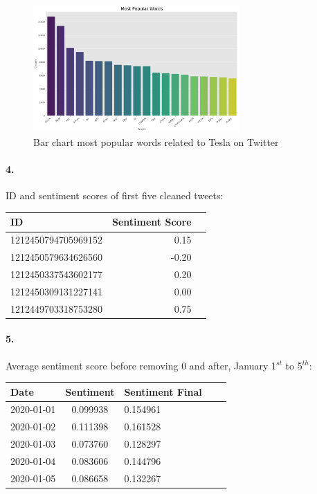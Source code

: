 \documentclass[12pt]{article}
\begin{document}
\begin{figure}[h!]
    \centering
    \includegraphics[width=0.7\textwidth]{images/popular_words.pdf}
    \caption{Bar chart most popular words related to Tesla on Twitter}
    \label{fig:bar_chart}
\end{figure}

\paragraph{4.} ID and sentiment scores of first five cleaned tweets:
\begin{center}
    \begin{tabular}{l rl}
    \rowcolor{gray!50}
         \textbf{ID} &  \textbf{Sentiment Score}\\
         \hline
         1212450794705969152 & 0.15\\
         1212450579634626560 & -0.20\\
         1212450337543602177 & 0.20\\
         1212450309131227141 & 0.00\\
         1212449703318753280 & 0.75\\
    \end{tabular}
\end{center}

\paragraph{5.} Average sentiment score before removing 0 and after, January 1$^{st}$ to 5$^{th}$:
\begin{center}
    \begin{tabular}{l cl rl}
    \rowcolor{gray!50}
        \bf{Date} & \bf{Sentiment} & \bf{Sentiment Final}\\
        \hline
        2020-01-01 &    0.099938&	0.154961\\
        2020-01-02 &	0.111398&	0.161528\\
        2020-01-03 &	0.073760&	0.128297\\
        2020-01-04 &	0.083606&	0.144796\\
        2020-01-05 &	0.086658&	0.132267\\
    \end{tabular}
\end{center}
\end{document}
